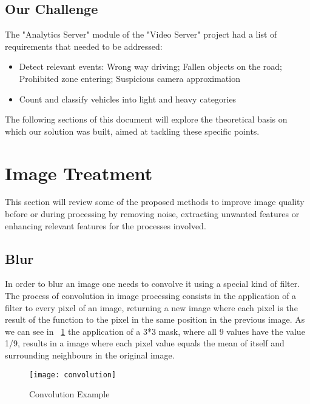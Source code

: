 \subsection{Our Challenge}

The "Analytics Server" module of the "Video Server" project had a list of requirements that needed to be addressed:

\begin{itemize}
	\item Detect relevant events:
		\subitem Wrong way driving;
		\subitem Fallen objects on the road;
		\subitem Prohibited zone entering;
		\subitem Suspicious camera approximation
	\item Count and classify vehicles into light and heavy categories
\end{itemize}

The following sections of this document will explore the theoretical basis on which our solution was built, aimed at tackling these specific points.

\section{Image Treatment}

This section will review some of the proposed methods to improve image quality before or during processing by removing noise, extracting unwanted features or enhancing relevant features for the processes involved.

\subsection{Blur}

In order to blur an image one needs to convolve it using a special kind of filter. The process of convolution in image processing consists in the application of a filter to every pixel of an image, returning a new image where each pixel is the result of the function to the pixel in the same position in the previous image. As we can see in ~\ref{fig:convolution} the application of a 3*3 mask, where all 9 values have the value 1/9, results in a image where each pixel value equals the mean of itself and surrounding neighbours in the original image.

\begin{figure}[h]
  \begin{center}
    \leavevmode
    \texttt{[image: convolution]}
    \caption{Convolution Example ~\cite{labs_theory_2017}}
    \label{fig:convolution}
  \end{center}
\end{figure}


